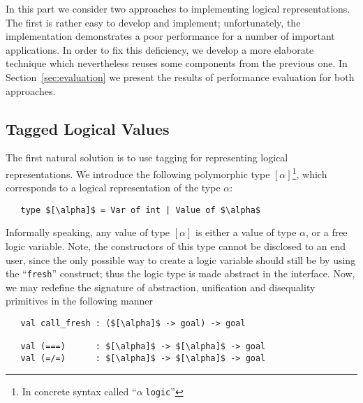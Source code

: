 
In this part we consider two approaches to implementing logical representations.  The first is rather easy to 
develop and implement; unfortunately, the implementation demonstrates a poor performance for a number of 
important applications. In order to fix this deficiency, we develop a more elaborate technique which 
nevertheless reuses some components from the previous one. In Section~\ref{sec:evaluation}
we present the results of performance evaluation for both approaches.

\subsection{Tagged Logical Values}

The first natural solution is to use tagging for representing logical representations.
We introduce the following polymorphic type $[\alpha]$\footnote{In concrete syntax called ``$\alpha\;$\lstinline{logic}''}, which 
corresponds to a logical representation of the type $\alpha$:

\begin{lstlisting}
   type $[\alpha]$ = Var of int | Value of $\alpha$
\end{lstlisting}

Informally speaking, any value of type $[\alpha]$ is either a value of type $\alpha$, or a free
logic variable. Note, the constructors of this type cannot be disclosed to an end user, since the only possible way to create a logic variable 
should still be by using the ``\lstinline{fresh}'' construct; thus the logic type is made abstract in the interface.
Now, we may redefine the signature of abstraction, unification and disequality primitives in the
following manner

\begin{lstlisting}
   val call_fresh : ($[\alpha]$ -> goal) -> goal

   val (===)      : $[\alpha]$ -> $[\alpha]$ -> goal
   val (=/=)      : $[\alpha]$ -> $[\alpha]$ -> goal
\end{lstlisting}

